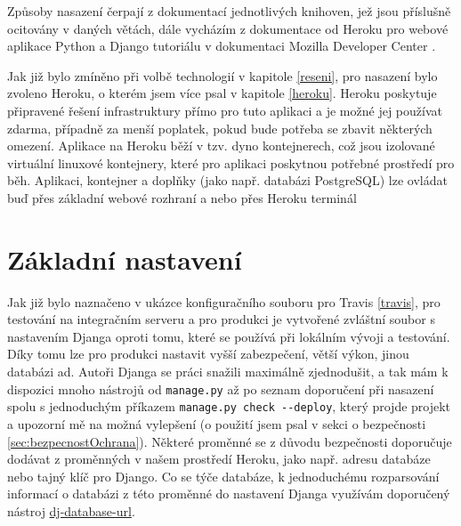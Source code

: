    Způsoby nasazení čerpají z dokumentací jednotlivých knihoven, jež jsou příslušně ocitovány v daných větách, dále vycházím z dokumentace od Heroku pro webové aplikace Python \cite{heroku-python} a Django tutoriálu v dokumentaci Mozilla Developer Center \cite{mdn-django}.
    
    Jak již bylo zmíněno při volbě technologií v kapitole \ref{reseni}, pro nasazení bylo zvoleno Heroku, o kterém jsem více psal v kapitole \ref{heroku}. Heroku poskytuje připravené řešení infrastruktury přímo pro tuto aplikaci a je možné jej používat zdarma, případně za menší poplatek, pokud bude potřeba se zbavit některých omezení. Aplikace na Heroku běží v tzv. dyno kontejnerech, což jsou izolované virtuální linuxové kontejnery, které pro aplikaci poskytnou potřebné prostředí pro běh. Aplikaci, kontejner a doplňky (jako např. databázi PostgreSQL) lze ovládat buď přes základní webové rozhraní a nebo přes Heroku terminál
    
    \section{Základní nastavení}\label{sec:zakladniNastaveni}
    Jak již bylo naznačeno v ukázce konfiguračního souboru pro Travis \ref{travis}, pro testování na integračním serveru a pro produkci je vytvořené zvláštní soubor s nastavením Djanga oproti tomu, které se používá při lokálním vývoji a testování. Díky tomu lze pro produkci nastavit vyšší zabezpečení, větší výkon, jinou databázi ad. Autoři Djanga se práci snažili maximálně zjednodušit, a tak mám k dispozici mnoho nástrojů od \verb|manage.py| až po seznam doporučení při nasazení \cite{django-checklist} spolu s jednoduchým příkazem \verb|manage.py check --deploy|, který projde projekt a upozorní mě na možná vylepšení (o použití jsem psal v sekci o bezpečnosti \ref{sec:bezpecnostOchrana}). Některé proměnné se z důvodu bezpečnosti doporučuje dodávat z proměnných v našem prostředí Heroku, jako např. adresu databáze nebo tajný klíč pro Django. Co se týče databáze, k jednoduchému rozparsování informací o databázi z této proměnné do nastavení Djanga využívám doporučený nástroj \href{https://github.com/kennethreitz/dj-database-url}{dj-database-url}.
    
